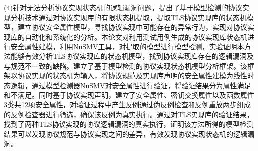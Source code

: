 (4)针对无法分析协议实现状态机的逻辑漏洞问题，提出了基于模型检测的协议实现分析技术通过对协议实现库的有限状态机提取，提取TLS协议实现库的状态机模型，建立协议安全属性模型，寻找协议实现中可能存在的异常行为，实现对协议实现库的自动化和系统化的分析。本论文对利用测试用例生成的协议实现库状态机进行安全属性建模，利用NuSMV工具，对提取的模型进行模型检测，实验证明本方法能够有效分析TLS协议实现库的状态机模型，找到协议实现库存在的逻辑漏洞及与规范不一致的缺陷。建立了基于模型检测的协议实现状态机模型分析框架。该框架以协议实现的状态机为输入，将协议规范及实现库声明的安全属性建模为线性时态逻辑，通过模型检测器NuSMV对安全属性进行验证，将验证结果分为属性满足和不满足。同时基于协议实现声明，建立了安全属性、密钥交换属性以及函数属性3类共12项安全属性，对验证过程中产生反例通过伪反例检查和反例重放两步组成的反例检查器进行筛选，确保该反例为真实执行。通过对TLS实现库的验证结果，找到了两种TLS协议实现的协议逻辑漏洞的真实执行，证明该方法所得的模型检测结果可以发现协议规范与协议实现之间的差异，有效发现协议实现状态机的逻辑漏洞。



